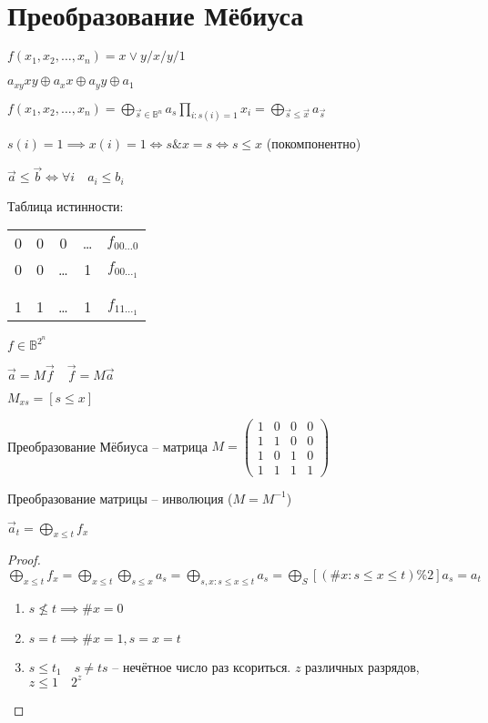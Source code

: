 \documentclass{book}
\theoremstyle{definition}
\begin{document}
\section{Преобразование Мёбиуса}
$f(x_1, x_2, \ldots, x_{n} ) = x\vee y / x / y / 1$    

$a_{xy}xy \oplus a_x x \oplus a_y y \oplus a_1$

$f(x_1, x_2, \ldots, x_{n} ) = \bigoplus\limits_{\vec s \in \mathbb{B}^n} a_s \prod\limits_{i:s(i) = 1} x_i = \bigoplus\limits_{\vec s\leqslant \vec x} a_{\vec s}$

$s(i) = 1 \implies  x(i) = 1 \iff  s\& x = s \iff s\leqslant x$ (покомпонентно)

\begin{definition}
    [Доминирование]

    $\vec a \leqslant  \vec b \iff  \forall i\quad a_i\leqslant b_i$
\end{definition}

Таблица истинности:
\begin{tabular}{cccc|c}
    0&0&0&\ldots&$f_{00\ldots0}$\\
    0& 0 & \ldots & 1& $f_{00\ldots_1}$\\
     &&&&\\
     &&&&\\
    1&1&\ldots&1&$f_{11\ldots_1}$\\
\end{tabular}

$f\in \mathbb{B}^{2^n}$

$\vec a = M\vec f\quad \vec f = M\vec a$

$M_{xs} = [s\leqslant x]$

Преобразование Мёбиуса -- матрица $M = \begin{pmatrix} 1&0&0&0\\1&1&0&0\\1&0&1&0\\1&1&1&1 \end{pmatrix}$



\begin{theorem}
    Преобразование матрицы --  инволюция ($M = M^{-1}$)

    $\vec a_t = \bigoplus\limits_{x\leqslant t} f_x $
\end{theorem}
\begin{proof}
    $\bigoplus\limits_{x\leqslant t}f_x = \bigoplus\limits_{x\leqslant t}\bigoplus\limits_{s\leqslant x} a_s = \bigoplus\limits_{s,x:s\leqslant x\leqslant t}a_s = \bigoplus\limits_S [(\#x: s\leqslant x\leqslant t)\%2]a_s = a_t$

    \begin{enumerate}
        \item $s\not\leqslant t \implies  \#x = 0$
        \item $s=t \implies  \#x = 1, s=x=t$
        \item $s\leqslant t_1\quad s\neq ts$ -- нечётное число раз ксориться. $z$ различных разрядов, $z\leqslant 1\quad 2^{z}$
    \end{enumerate}
\end{proof}
\end{document}
